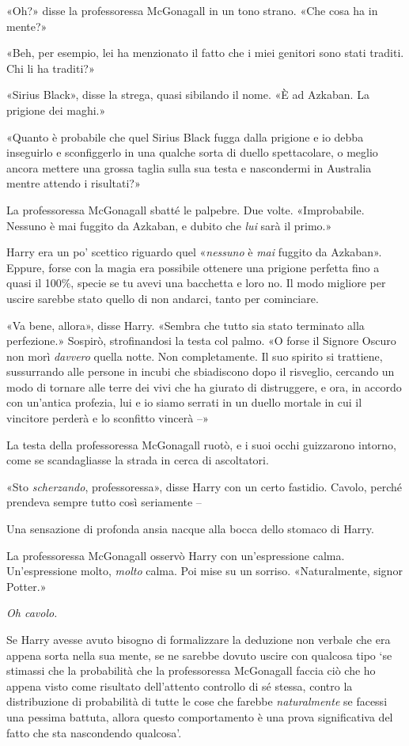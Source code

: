 «Oh?» disse la professoressa McGonagall in un tono strano. «Che cosa ha in mente?»

«Beh, per esempio, lei ha menzionato il fatto che i miei genitori sono stati traditi. Chi li ha traditi?»

«Sirius Black», disse la strega, quasi sibilando il nome. «È ad Azkaban. La prigione dei maghi.»

«Quanto è probabile che quel Sirius Black fugga dalla prigione e io debba inseguirlo e sconfiggerlo in una qualche sorta di duello spettacolare, o meglio ancora mettere una grossa taglia sulla sua testa e nascondermi in Australia mentre attendo i risultati?»

La professoressa McGonagall sbatté le palpebre. Due volte. «Improbabile. Nessuno è mai fuggito da Azkaban, e dubito che \textit{lui} sarà il primo.»

Harry era un po’ scettico riguardo quel «\textit{nessuno} è \textit{mai} fuggito da Azkaban». Eppure, forse con la magia era possibile ottenere una prigione perfetta fino a quasi il 100\%, specie se tu avevi una bacchetta e loro no. Il modo migliore per uscire sarebbe stato quello di non andarci, tanto per cominciare.

«Va bene, allora», disse Harry. «Sembra che tutto sia stato terminato alla perfezione.» Sospirò, strofinandosi la testa col palmo. «O forse il Signore Oscuro non morì \textit{davvero} quella notte. Non completamente. Il suo spirito si trattiene, sussurrando alle persone in incubi che sbiadiscono dopo il risveglio, cercando un modo di tornare alle terre dei vivi che ha giurato di distruggere, e ora, in accordo con un’antica profezia, lui e io siamo serrati in un duello mortale in cui il vincitore perderà e lo sconfitto vincerà –»

La testa della professoressa McGonagall ruotò, e i suoi occhi guizzarono intorno, come se scandagliasse la strada in cerca di ascoltatori.

«Sto \textit{scherzando}, professoressa», disse Harry con un certo fastidio. Cavolo, perché prendeva sempre tutto così seriamente –

Una sensazione di profonda ansia nacque alla bocca dello stomaco di Harry.

La professoressa McGonagall osservò Harry con un’espressione calma. Un’espressione molto, \textit{molto} calma. Poi mise su un sorriso. «Naturalmente, signor Potter.»

\textit{Oh cavolo.}

Se Harry avesse avuto bisogno di formalizzare la deduzione non verbale che era appena sorta nella sua mente, se ne sarebbe dovuto uscire con qualcosa tipo ‘se stimassi che la probabilità che la professoressa McGonagall faccia ciò che ho appena visto come risultato dell’attento controllo di sé stessa, contro la distribuzione di probabilità di tutte le cose che farebbe \textit{naturalmente} se facessi una pessima battuta, allora questo comportamento è una prova significativa del fatto che sta nascondendo qualcosa’.

